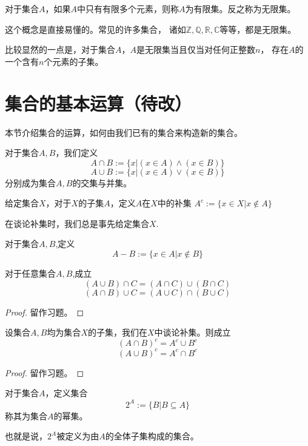 \begin{definition}[有限集与无限集]
对于集合$A$，如果$A$中只有有限多个元素，则称$A$为有限集。反之称为无限集。
\end{definition}
这个概念是直接易懂的。常见的许多集合，
诸如$\mathbb{Z},\mathbb{Q},\mathbb{R},\mathbb{C}$等等，都是无限集。

比较显然的一点是，对于集合$A$，$A$是无限集当且仅当对任何正整数$n$，
存在$A$的一个含有$n$个元素的子集。

\section{集合的基本运算（待改）}

本节介绍集合的运算，如何由我们已有的集合来构造新的集合。
\begin{definition}[集合的交、并]
对于集合$A,B$，我们定义
$$A\cap B:=\{x|(x\in A)\wedge(x\in B)\}$$
$$A\cup B:=\{x|(x\in A)\vee(x\in B)\}$$
分别成为集合$A,B$的交集与并集。
\end{definition}

\begin{definition}[补集]
给定集合$X$，对于$X$的子集$A$，定义$A$在$X$中的补集
$A^c:=\{x\in X|x\not\in A\}$
\end{definition}
在谈论补集时，我们总是事先给定集合$X$.

\begin{definition}[差集]
对于集合$A,B$,定义
$$A-B:=\{x\in A|x\not\in B\}$$
\end{definition}

\begin{prop}[交、并的分配律]\label{set-fenpeilv}
对于任意集合$A,B$,成立
$$(A\cup B)\cap C=(A\cap C)\cup(B\cap C)$$
$$(A\cap B)\cup C=(A\cup C)\cap(B\cup C)$$
\end{prop}
\begin{proof}
留作习题。
\end{proof}

\begin{prop}[摩根律]\label{set-morgen}
设集合$A,B$均为集合$X$的子集，我们在$X$中谈论补集。则成立
$$(A\cap B)^c=A^c\cup B^c$$
$$(A\cup B)^c=A^c\cap B^c$$
\end{prop}
\begin{proof}
留作习题。
\end{proof}

\begin{definition}[幂集]
对于集合$A$，定义集合
$$2^A:=\{B|B\subseteq A\}$$
称其为集合$A$的幂集。
\end{definition}
也就是说，$2^A$被定义为由$A$的全体子集构成的集合。


